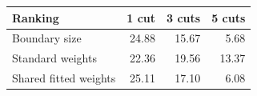 \begin{tabular}{@{}lrrr@{}}
\toprule
Ranking & 1 cut & 3 cuts & 5 cuts \\
\midrule
Boundary size & 24.88 & 15.67 & 5.68 \\
Standard weights & 22.36 & 19.56 & 13.37 \\
Shared fitted weights & 25.11 & 17.10 & 6.08 \\
\bottomrule
\end{tabular}
